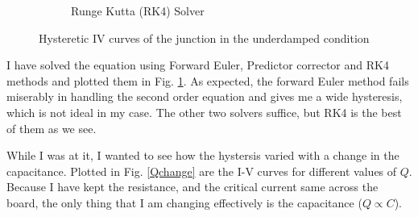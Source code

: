 \documentclass{thesis}
\begin{document}
\begin{figure}[H]
\begin{subfigure}[b]{0.32\textwidth}
        \caption{Runge Kutta (RK4) Solver}
    \end{subfigure}
    \caption{Hysteretic IV curves of the junction in the underdamped condition}
    \label{solvers}
\end{figure}

I have solved the equation using Forward Euler, Predictor corrector and RK4 methods and plotted them in Fig. \ref{solvers}. As expected, the forward Euler method fails miserably in handling the second order equation and gives me a wide hysteresis, which is not ideal in my case. The other two solvers suffice, but RK4 is the best of them as we see.

While I was at it, I wanted to see how the hystersis varied with a change in the capacitance. Plotted in Fig. \ref{Qchange} are the I-V curves for different values of $Q$. Because I have kept the resistance, and the critical current same across the board, the only thing that I am changing effectively is the capacitance ($Q \propto C$).
\end{document}

